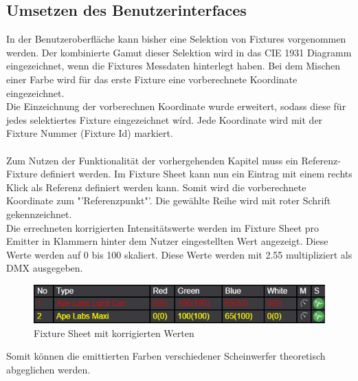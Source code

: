 \documentclass[11pt]{scrartcl}
\begin{document}
\subsection{Umsetzen des Benutzerinterfaces}
In der Benutzeroberfläche kann bisher eine Selektion von Fixtures vorgenommen werden. Der kombinierte Gamut dieser Selektion wird in das CIE 1931 Diagramm
eingezeichnet, wenn die Fixtures Messdaten hinterlegt haben. Bei dem Mischen einer Farbe wird für das erste Fixture eine vorberechnete Koordinate
eingezeichnet.\\
Die Einzeichnung der vorberechnen Koordinate wurde erweitert, sodass diese für jedes selektiertes Fixture eingezeichnet wírd. Jede Koordinate wird mit
der Fixture Nummer (Fixture Id) markiert.\\
\\
Zum Nutzen der Funktionalität der vorhergehenden Kapitel muss ein Referenz-Fixture definiert werden. Im Fixture Sheet kann nun ein Eintrag mit
einem rechts Klick als Referenz definiert werden kann. Somit wird die vorberechnete Koordinate zum "'Referenzpunkt"'. Die gewählte Reihe wird mit roter
Schrift gekennzeichnet.\\
Die errechneten korrigierten Intensitätswerte werden im Fixture Sheet pro Emitter in Klammern hinter dem Nutzer eingestellten Wert angezeigt. Diese Werte
werden auf 0 bis 100 skaliert. Diese Werte werden mit 2.55 multipliziert als DMX ausgegeben.
\begin{figure}[H]
    \begin{center}
        \includegraphics[width=.8\textwidth]{images/app_fixture_sheet_with_reference.png}
    \end{center}
    \caption{Fixture Sheet mit korrigierten Werten}
\end{figure}
\noindent
Somit können die emittierten Farben verschiedener Scheinwerfer theoretisch abgeglichen werden.
\clearpage

\end{document}
